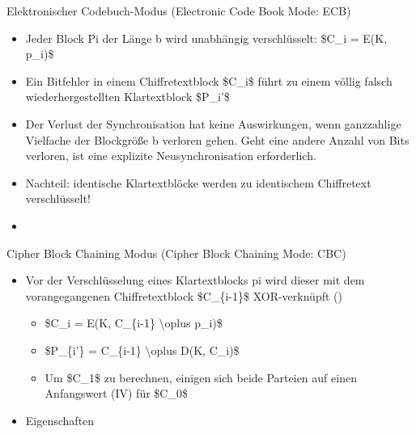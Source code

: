 \documentclass[a4paper]{article}
\begin{document}
\begin{multicols}{3}
    Elektronischer Codebuch-Modus (Electronic Code Book Mode: ECB)

    \begin{itemize}
        \item
              Jeder Block Pi der Länge b wird unabhängig verschlüsselt: \$C\_i =
              E(K, p\_i)\$
        \item
              Ein Bitfehler in einem Chiffretextblock \$C\_i\$ führt zu einem völlig
              falsch wiederhergestellten Klartextblock \$P\_i'\$
        \item
              Der Verlust der Synchronisation hat keine Auswirkungen, wenn
              ganzzahlige Vielfache der Blockgröße b verloren gehen. Geht eine
              andere Anzahl von Bits verloren, ist eine explizite Neusynchronisation
              erforderlich.
        \item
              Nachteil: identische Klartextblöcke werden zu identischem Chiffretext
              verschlüsselt!
        \item
    \end{itemize}

    Cipher Block Chaining Modus (Cipher Block Chaining Mode: CBC)

    \begin{itemize}
        \item
              Vor der Verschlüsselung eines Klartextblocks pi wird dieser mit dem
              vorangegangenen Chiffretextblock \$C\_\{i-1\}\$ XOR-verknüpft ()

              \begin{itemize}
                  \item
                        \$C\_i = E(K, C\_\{i-1\} \textbackslash oplus p\_i)\$
                  \item
                        \$P\_\{i'\} = C\_\{i-1\} \textbackslash oplus D(K, C\_i)\$
                  \item
                        Um \$C\_1\$ zu berechnen, einigen sich beide Parteien auf einen
                        Anfangswert (IV) für \$C\_0\$
              \end{itemize}
        \item
              Eigenschaften


\end{itemize}
\end{multicols}
\end{document}
